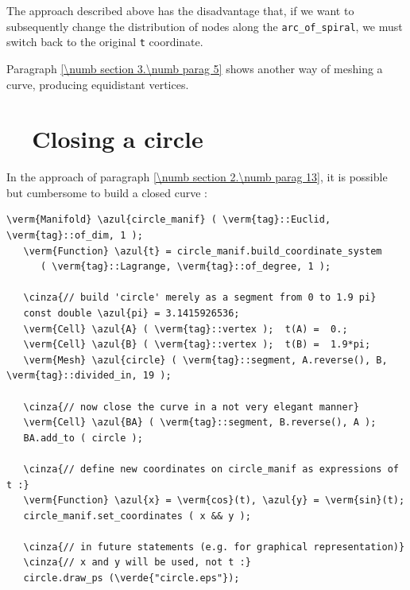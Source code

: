 The approach described above has the disadvantage that, if we want to subsequently change the
distribution of nodes along the {\small\tt arc\_of\_spiral}, we must switch back to the original
{\small\tt t} coordinate.

Paragraph \ref{\numb section 3.\numb parag 5} shows another way of meshing a curve,
producing equidistant vertices.


\section{~~Closing a circle}\label{\numb section 2.\numb parag 14}

In the approach of paragraph \ref{\numb section 2.\numb parag 13}, it is possible but cumbersome to
build a closed curve :

\begin{Verbatim}[commandchars=\\\{\},formatcom=\small\tt,frame=single,
   label=main-\ref{\numb section 2.\numb parag 14}.cpp,rulecolor=\color{coment},
   baselinestretch=0.94,framesep=2mm]
   \verm{Manifold} \azul{circle_manif} ( \verm{tag}::Euclid, \verm{tag}::of_dim, 1 );
   \verm{Function} \azul{t} = circle_manif.build_coordinate_system
      ( \verm{tag}::Lagrange, \verm{tag}::of_degree, 1 );

   \cinza{// build 'circle' merely as a segment from 0 to 1.9 pi}
   const double \azul{pi} = 3.1415926536;
   \verm{Cell} \azul{A} ( \verm{tag}::vertex );  t(A) =  0.;
   \verm{Cell} \azul{B} ( \verm{tag}::vertex );  t(B) =  1.9*pi;
   \verm{Mesh} \azul{circle} ( \verm{tag}::segment, A.reverse(), B, \verm{tag}::divided_in, 19 );

   \cinza{// now close the curve in a not very elegant manner}
   \verm{Cell} \azul{BA} ( \verm{tag}::segment, B.reverse(), A );
   BA.add_to ( circle );

   \cinza{// define new coordinates on circle_manif as expressions of t :}
   \verm{Function} \azul{x} = \verm{cos}(t), \azul{y} = \verm{sin}(t);
   circle_manif.set_coordinates ( x && y );

   \cinza{// in future statements (e.g. for graphical representation)}
   \cinza{// x and y will be used, not t :}
   circle.draw_ps (\verde{"circle.eps"});
\end{Verbatim}


